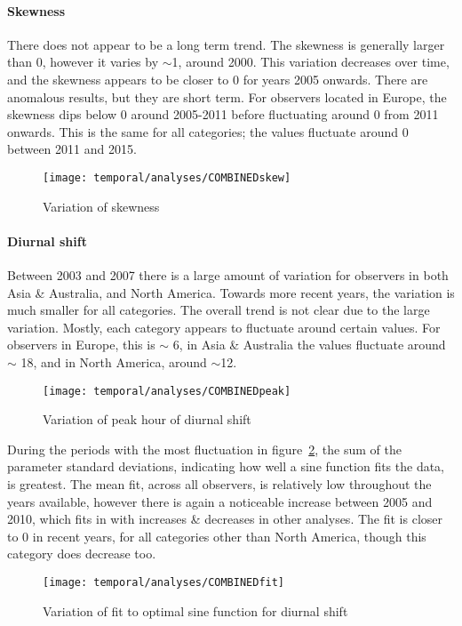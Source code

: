 \paragraph{Skewness\\}
There does not appear to be a long term trend. The skewness is generally larger than 0, however it varies by $\sim$1, around 2000. This variation decreases over time, and the skewness appears to be closer to 0 for years 2005 onwards. There are anomalous results, but they are short term. For observers located in Europe, the skewness dips below 0 around 2005-2011 before fluctuating around 0 from 2011 onwards. This is the same for all categories; the values fluctuate around 0 between 2011 and 2015.
\begin{figure}[h!]
	\centering
	\texttt{[image: temporal/analyses/COMBINEDskew]}
	\caption{Variation of skewness
		\label{fig:temp:skew}}
\end{figure}
\paragraph{Diurnal shift\\}
Between 2003 and 2007 there is a large amount of variation for observers in both Asia \& Australia, and North America. Towards more recent years, the variation is much smaller for all categories. The overall trend is not clear due to the large variation. Mostly, each category appears to fluctuate around certain values. For observers in Europe, this is $\sim$ 6, in Asia \& Australia the values fluctuate around $\sim$ 18, and in North America, around $\sim$12.
\begin{figure}[h!]
	\centering
	\texttt{[image: temporal/analyses/COMBINEDpeak]}
	\caption{Variation of peak hour of diurnal shift
		\label{fig:temp:peak}}
\end{figure}
During the periods with the most fluctuation in figure~\ref{fig:temp:peak}, the sum of the parameter standard deviations, indicating how well a sine function fits the data, is greatest. The mean fit, across all observers, is relatively low throughout the years available, however there is again a noticeable increase between 2005 and 2010, which fits in with increases \& decreases in other analyses. The fit is closer to 0 in recent years, for all categories other than North America, though this category does decrease too.
\begin{figure}[h!]
	\centering
	\texttt{[image: temporal/analyses/COMBINEDfit]}
	\caption{Variation of fit to optimal sine function for diurnal shift
		\label{fig:temp:fit}}
\end{figure}


